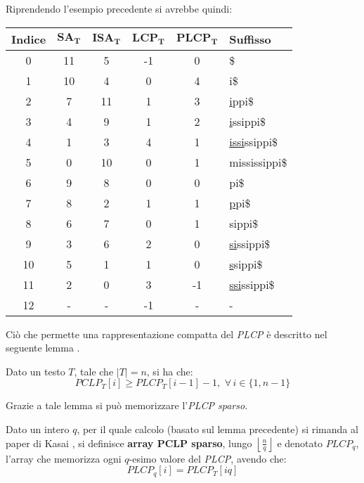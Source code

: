 \begin{esempio}
  Riprendendo l'esempio precedente si avrebbe quindi:
  \begin{table}[H]
    \centering
    \footnotesize
    \begin{tabular}{c|c|c|c|c|l} 
      \textbf{Indice} & $\mathbf{SA_T}$ & $\mathbf{ISA_T}$ & $\mathbf{LCP_T}$
      & $\mathbf{PLCP_T}$ & \textbf{Suffisso}\\  
      \hline
      0 & 11 & 5 & -1 & 0 & \$\\
      1 & 10 & 4 & 0 & 4 & i\$\\
      2 & 7 & 11 & 1 & 3 & \underline{i}ppi\$\\
      3 & 4 & 9 & 1 & 2 & \underline{i}ssippi\$\\
      4 & 1 & 3 & 4 & 1 & \underline{issi}ssippi\$\\
      5 & 0 & 10 & 0 & 1 & mississippi\$\\
      6 & 9 & 8 & 0 & 0 & pi\$\\
      7 & 8 & 2 & 1 & 1 & \underline{p}pi\$\\
      8 & 6 & 7 & 0 & 1 & sippi\$\\
      9 & 3 & 6 & 2 & 0 & \underline{si}ssippi\$\\
      10 & 5 & 1 & 1 & 0 & \underline{s}sippi\$\\
      11 & 2 & 0 & 3 & -1 & \underline{ssi}ssippi\$\\
      12 & - & - & -1 & - & - 
    \end{tabular}
  \end{table}
\end{esempio}
Ciò che permette una rappresentazione compatta del \textit{PLCP} è descritto nel
seguente lemma \cite{plcp3}.
\begin{lemma}
  Dato un testo $T$, tale che $|T|=n$, si ha che:
  \begin{equation}
    \label{eq:plcpdef3}
    PCLP_T[i]\geq PLCP_T[i-1]-1,\,\,\forall\, i\in\{1,n-1\}
  \end{equation}
\end{lemma}
Grazie a tale lemma si può memorizzare l'\textit{PLCP sparso}.
\begin{definizione}
  Dato un intero
  $q$, per il quale calcolo (basato sul lemma precedente) si rimanda al paper di
  Kasai \cite{plcp3}, si definisce \textbf{array PCLP sparso}, lungo
  $\left\lfloor\frac{n}{q}\right\rfloor$ e denotato $PLCP_q$, l'array che
  memorizza ogni $q$-esimo valore del \textit{PLCP}, avendo che:
  \begin{equation}
    \label{eq:plcpdef4}
    PLCP_q[i]=PLCP_T[iq]
  \end{equation}
\end{definizione}
